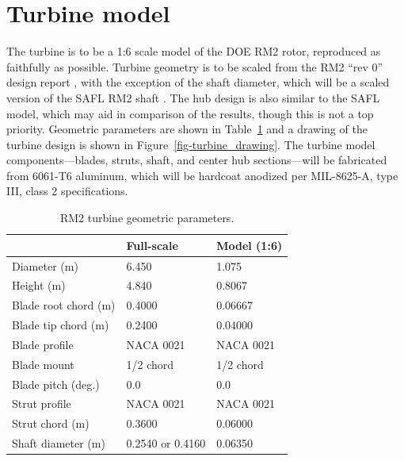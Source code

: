 \documentclass[12pt,letterpaper]{scrreprt}
\begin{document}
\section{Turbine model}

The turbine is to be a 1:6 scale model of the DOE RM2 rotor, reproduced as
faithfully as possible. Turbine geometry is to be scaled from the RM2 ``rev 0''
design report \cite{Barone2011}, with the exception of the shaft diameter, which
will be a scaled version of the SAFL RM2 shaft \cite{Hill2014}. The hub design
is also similar to the SAFL model, which may aid in comparison of the results,
though this is not a top priority. Geometric parameters are shown in
Table~\ref{tab-turb_geom} and a drawing of the turbine design is shown in
Figure~\ref{fig-turbine_drawing}. The turbine model components---blades, struts,
shaft, and center hub sections---will be fabricated from 6061-T6 aluminum, which
will be hardcoat anodized per MIL-8625-A, type III, class 2 specifications.

\begin{table}[ht]
\centering
\begin{tabular}{l|l|l}
   & Full-scale & Model (1:6) \\
\hline 
Diameter (m)   & 6.450 & 1.075 \\ 
Height (m)     & 4.840 & 0.8067 \\ 
Blade root chord (m) & 0.4000 & 0.06667 \\ 
Blade tip chord (m)  & 0.2400 & 0.04000 \\ 
Blade profile & NACA 0021 & NACA 0021 \\ 
Blade mount & 1/2 chord & 1/2 chord \\ 
Blade pitch (deg.) & 0.0 & 0.0 \\ 
Strut profile & NACA 0021 & NACA 0021 \\ 
Strut chord (m) & 0.3600 & 0.06000 \\ 
Shaft diameter (m) & 0.2540 \cite{Beam2011} or 0.4160 \cite{Hill2014} & 0.06350\\ 
\end{tabular}
\caption{RM2 turbine geometric parameters.}
\label{tab-turb_geom}
\end{table}
\end{document}
